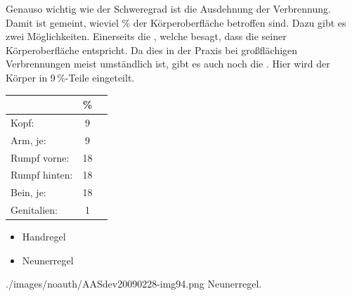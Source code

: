 {
Genauso wichtig wie der Schweregrad ist die Ausdehnung der
Verbrennung. Damit ist gemeint, wieviel \% der Körperoberfläche betroffen sind.
Dazu gibt es zwei Möglichkeiten. Einerseits die , welche
besagt, dass die 
seiner Körperoberfläche entspricht. Da dies in der Praxis
bei großflächigen Verbrennungen meist umständlich ist, gibt
es auch noch die . Hier wird der Körper in
9\,\%-Teile eingeteilt.

\begin{center}
\begin{tabulary}{\linewidth}[H]{LCC}
\toprule
 & \% &
\\\midrule
Kopf:
 & 9  &
\\
Arm, je:  &  9  &
\\
Rumpf vorne: & 18  &
\\
Rumpf hinten: & 18 &
\\
Bein, je: & 18 &
\\
Genitalien:  & 1 &
\\\bottomrule
\end{tabulary}
\end{center}
}
{\begin{itemize}
    \item Handregel
    \item Neunerregel
\end{itemize}}
{./images/noauth/AASdev20090228-img94.png}
{Neunerregel.}{}




